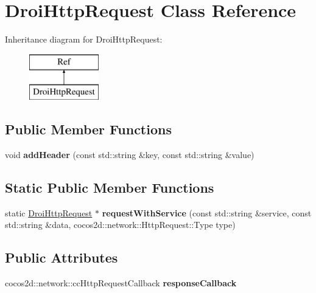 \hypertarget{class_droi_http_request}{}\section{Droi\+Http\+Request Class Reference}
\label{class_droi_http_request}
Inheritance diagram for Droi\+Http\+Request\+:\begin{figure}[H]
\begin{center}
\leavevmode
\includegraphics[height=2.000000cm]{da/d4e/class_droi_http_request}
\end{center}
\end{figure}
\subsection*{Public Member Functions}
\begin{DoxyCompactItemize}
\item 
\mbox{\label{class_droi_http_request_aae0f806ef0b4b37ebf501627c9b9ff56}} 
void {\bfseries add\+Header} (const std\+::string \&key, const std\+::string \&value)
\end{DoxyCompactItemize}
\subsection*{Static Public Member Functions}
\begin{DoxyCompactItemize}
\item 
\mbox{\label{class_droi_http_request_a72ba34132538704d8970672e59e666eb}} 
static \hyperlink{class_droi_http_request}{Droi\+Http\+Request} $\ast$ {\bfseries request\+With\+Service} (const std\+::string \&service, const std\+::string \&data, cocos2d\+::network\+::\+Http\+Request\+::\+Type type)
\end{DoxyCompactItemize}
\subsection*{Public Attributes}
\begin{DoxyCompactItemize}
\item 
\mbox{\label{class_droi_http_request_a0d121427e323923d916d6772bbc59f65}} 
cocos2d\+::network\+::cc\+Http\+Request\+Callback {\bfseries response\+Callback}
\end{DoxyCompactItemize}
